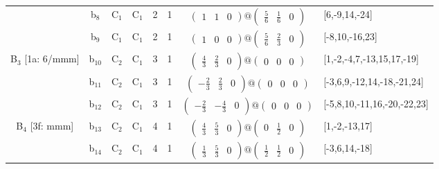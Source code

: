\documentclass[fleqn,10pt,landscape]{article}
\begin{document}
\begin{itemize}
\begin{center}
\begin{longtable}{cc|cc|c|c|c|l}
& b$_{8}$ & C$_{1}$ & C$_{1}$ & 2 & 1 & $\begin{pmatrix} 1 & 1 & 0 \end{pmatrix}@\begin{pmatrix} \frac{5}{6} & \frac{1}{6} & 0 \end{pmatrix}$ & [6,-9,14,-24] \\
& b$_{9}$ & C$_{1}$ & C$_{1}$ & 2 & 1 & $\begin{pmatrix} 1 & 0 & 0 \end{pmatrix}@\begin{pmatrix} \frac{5}{6} & \frac{2}{3} & 0 \end{pmatrix}$ & [-8,10,-16,23] \\ \hline
B$_{3}$ [1a: 6/mmm] & b$_{10}$ & C$_{2}$ & C$_{1}$ & 3 & 1 & $\begin{pmatrix} \frac{4}{3} & \frac{2}{3} & 0 \end{pmatrix}@\begin{pmatrix} 0 & 0 & 0 \end{pmatrix}$ & [1,-2,-4,7,-13,15,17,-19] \\
& b$_{11}$ & C$_{2}$ & C$_{1}$ & 3 & 1 & $\begin{pmatrix} - \frac{2}{3} & \frac{2}{3} & 0 \end{pmatrix}@\begin{pmatrix} 0 & 0 & 0 \end{pmatrix}$ & [-3,6,9,-12,14,-18,-21,24] \\
& b$_{12}$ & C$_{2}$ & C$_{1}$ & 3 & 1 & $\begin{pmatrix} - \frac{2}{3} & - \frac{4}{3} & 0 \end{pmatrix}@\begin{pmatrix} 0 & 0 & 0 \end{pmatrix}$ & [-5,8,10,-11,16,-20,-22,23] \\ \hline
B$_{4}$ [3f: mmm] & b$_{13}$ & C$_{2}$ & C$_{1}$ & 4 & 1 & $\begin{pmatrix} \frac{4}{3} & \frac{5}{3} & 0 \end{pmatrix}@\begin{pmatrix} 0 & \frac{1}{2} & 0 \end{pmatrix}$ & [1,-2,-13,17] \\
& b$_{14}$ & C$_{2}$ & C$_{1}$ & 4 & 1 & $\begin{pmatrix} \frac{1}{3} & \frac{5}{3} & 0 \end{pmatrix}@\begin{pmatrix} \frac{1}{2} & \frac{1}{2} & 0 \end{pmatrix}$ & [-3,6,14,-18] \\

\end{longtable}
\end{center}
\end{itemize}
\end{document}
